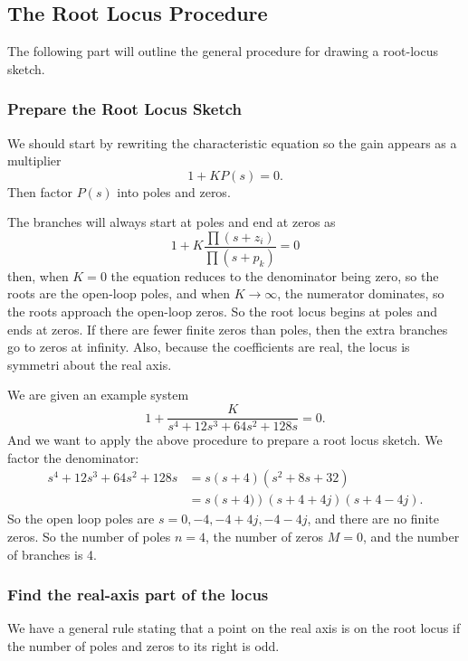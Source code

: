 \subsection{The Root Locus Procedure}
The following part will outline the general procedure for drawing a root-locus sketch.

\subsubsection{Prepare the Root Locus Sketch}
We should start by rewriting the characteristic equation so the gain appears as a multiplier
\begin{equation*}
  1 + KP(s) = 0
.\end{equation*}
Then factor $P(s)$ into poles and zeros.

The branches will always start at poles and end at zeros as
\begin{equation*}
  1 + K \frac{\prod (s + z_i)}{\prod ( s + p_k)} = 0
\end{equation*}
then, when $K = 0$ the equation reduces to the denominator being zero, so the roots are the open-loop poles, and when $K \to \infty$, the numerator dominates, so the roots approach the open-loop zeros.
So the root locus begins at poles and ends at zeros.
If there are fewer finite zeros than poles, then the extra branches go to zeros at infinity.
Also, because the coefficients are real, the locus is symmetri about the real axis.

\begin{exa}
  We are given an example system
  \begin{equation*}
    1 + \frac{K}{s^{4} + 12s^3 + 64s^2 + 128s} = 0
  .\end{equation*}
  And we want to apply the above procedure to prepare a root locus sketch.
  \tcblower
  We factor the denominator:
  \begin{align*}
    s^{4} + 12s^3 + 64s^2 + 128 s &= s(s+4) \left( s^2 + 8s + 32 \right) \\
    &= s \left( s+4) \right) \left( s+4+4j \right) \left( s + 4 - 4j \right)
  .\end{align*}
  So the open loop poles are $s = 0, -4, -4 + 4j, -4-4j$, and there are no finite zeros.
  So the number of poles $n = 4$, the number of zeros $M = 0$, and the number of branches is 4.
\end{exa}

\subsubsection{Find the real-axis part of the locus}
We have a general rule stating that a point on the real axis is on the root locus if the number of poles and zeros to its right is odd.


